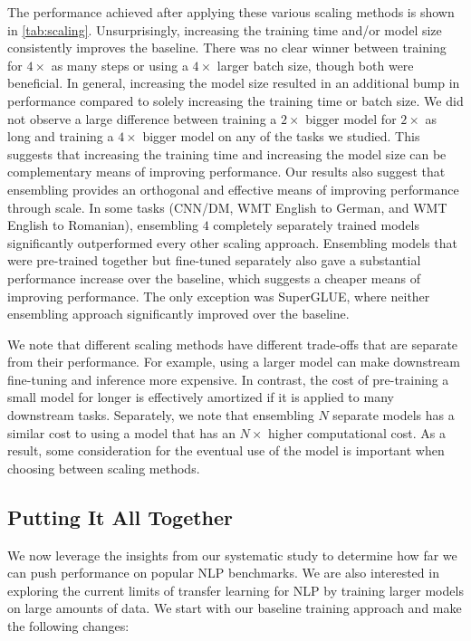 The performance achieved after applying these various scaling methods is shown in \ref{tab:scaling}.
Unsurprisingly, increasing the training time and/or model size consistently improves the baseline. There was no clear winner between training for $4\times$ as many steps or using a $4\times$ larger batch size, though both were beneficial. In general, increasing the model size resulted in an additional bump in performance compared to solely increasing the training time or batch size. We did not observe a large difference between training a $2\times$ bigger model for $2\times$ as long and training a $4\times$ bigger model on any of the tasks we studied. This suggests that increasing the training time and increasing the model size can be complementary means of improving performance. Our results also suggest that ensembling provides an orthogonal and effective means of improving performance through scale. In some tasks (CNN/DM, WMT English to German, and WMT English to Romanian), ensembling $4$ completely separately trained models significantly outperformed every other scaling approach. Ensembling models that were pre-trained together but fine-tuned separately also gave a substantial performance increase over the baseline, which suggests a cheaper means of improving performance. The only exception was SuperGLUE, where neither ensembling approach significantly improved over the baseline.

We note that different scaling methods have different trade-offs that are separate from their performance. For example, using a larger model can make downstream fine-tuning and inference more expensive. In contrast, the cost of pre-training a small model for longer is effectively amortized if it is applied to many downstream tasks. Separately, we note that ensembling $N$ separate models has a similar cost to using a model that has an $N\times$ higher computational cost. As a result, some consideration for the eventual use of the model is important when choosing between scaling methods.

\subsection{Putting It All Together}
\label{sec:together}

We now leverage the insights from our systematic study to determine how far we can push performance on popular NLP benchmarks. We are also interested in exploring the current limits of transfer learning for NLP by training larger models on large amounts of data. We start with our baseline training approach and make the following changes:

